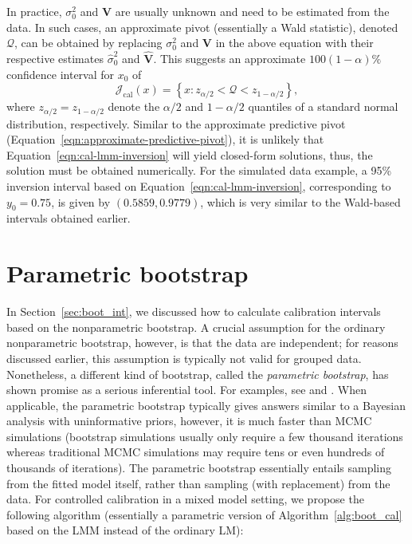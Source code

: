 \documentclass[cmfont,usenames,dvipsnames,leqno]{afit-etd}\usepackage[]{graphicx}\usepackage[]{color}
\newcommand{\mc}[1]{\ensuremath{\mathcal{#1}}}
\newcommand{\wh}[1]{\ensuremath{\widehat{#1}}}
\begin{document}
In practice, $\sigma_0^2$ and $\bm{V}$ are usually unknown and need to be estimated from the data. In such cases, an approximate pivot (essentially a Wald statistic), denoted $\mc{Q}$, can be obtained by replacing $\sigma_0^2$ and $\bm{V}$ in the above equation with their respective estimates $\wh{\sigma}_0^2$ and $\wh{\bm{V}}$. This suggests an approximate $100(1-\alpha)\%$ confidence interval for $x_0$ of
\begin{equation}
\label{eqn:cal-lmm-inversion}
  \mc{J}_\mathrm{cal}(x) = \left\{ x: z_{\alpha/2} < \mc{Q} < z_{1-\alpha/2} \right\},
\end{equation}
where $z_{\alpha/2} = z_{1-\alpha/2}$ denote the $\alpha/2$ and $1 - \alpha/2$ quantiles of a standard normal distribution, respectively. Similar to the approximate predictive pivot (Equation~\eqref{eqn:approximate-predictive-pivot}), it is unlikely that Equation~\eqref{eqn:cal-lmm-inversion} will yield closed-form solutions, thus, the solution must be obtained numerically. For the simulated data example, a 95\% inversion interval based on Equation~\eqref{eqn:cal-lmm-inversion}, corresponding to $y_0 = 0.75$, is given by $(0.5859, 0.9779)$, which is very similar to the Wald-based intervals obtained earlier.

\section{Parametric bootstrap}
\label{sec:calibration-lmm-parboot}
In Section~\ref{sec:boot_int}, we discussed how to calculate calibration intervals based on the nonparametric bootstrap. A crucial assumption for the ordinary nonparametric bootstrap, however, is that the data are independent; for reasons discussed earlier, this assumption is typically not valid for grouped data. Nonetheless, a different kind of bootstrap, called the \textit{parametric bootstrap}, has shown promise as a serious inferential tool. For examples, see \citet[pg. 342]{mcculloch_generalized_2008} and \citet{efron_bootstrap_2011}. When applicable, the parametric bootstrap typically gives answers similar to a Bayesian analysis with uninformative priors, however, it is much faster than MCMC simulations (bootstrap simulations usually only require a few thousand iterations whereas traditional MCMC simulations may require tens or even hundreds of thousands of iterations). The parametric bootstrap essentially entails sampling from the fitted model itself, rather than sampling (with replacement) from the data. For controlled calibration in a mixed model setting, we propose the following algorithm (essentially a parametric version of Algorithm~\ref{alg:boot_cal} based on the \ac{LMM} instead of the ordinary LM):
\end{document}
